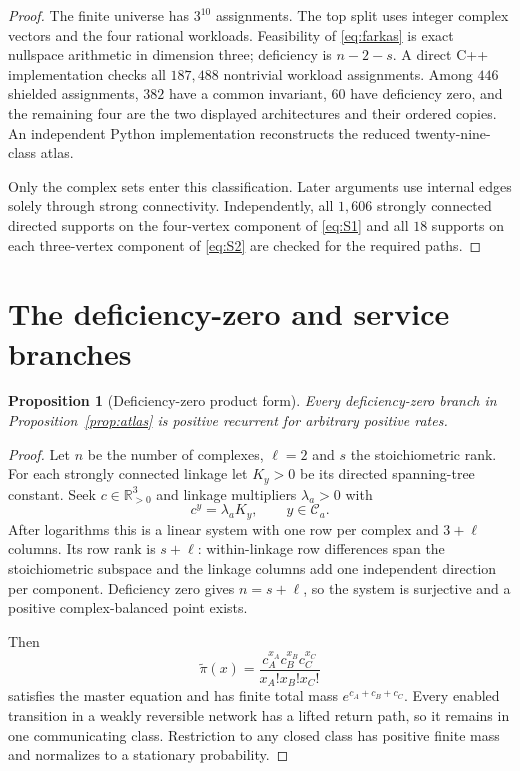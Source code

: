 \documentclass[11pt]{article}
\newtheorem{proposition}[theorem]{Proposition}
\theoremstyle{definition}\newtheorem{definition}[theorem]{Definition}
\theoremstyle{remark}\newtheorem{remark}[theorem]{Remark}
\begin{document}
\begin{proof}
The finite universe has $3^{10}$ assignments.  The top split uses integer complex vectors and the four rational workloads.  Feasibility of \eqref{eq:farkas} is exact nullspace arithmetic in dimension three; deficiency is $n-2-s$.  A direct C++ implementation checks all $187{,}488$ nontrivial workload assignments.  Among $446$ shielded assignments, $382$ have a common invariant, $60$ have deficiency zero, and the remaining four are the two displayed architectures and their ordered copies.  An independent Python implementation reconstructs the reduced twenty-nine-class atlas.

Only the complex sets enter this classification.  Later arguments use internal edges solely through strong connectivity.  Independently, all $1{,}606$ strongly connected directed supports on the four-vertex component of \eqref{eq:S1} and all $18$ supports on each three-vertex component of \eqref{eq:S2} are checked for the required paths.
\end{proof}

\section{The deficiency-zero and service branches}

\begin{proposition}[Deficiency-zero product form]\label{prop:dz}
Every deficiency-zero branch in Proposition~\ref{prop:atlas} is positive recurrent for arbitrary positive rates.
\end{proposition}

\begin{proof}
Let $n$ be the number of complexes, $\ell=2$ and $s$ the stoichiometric rank.  For each strongly connected linkage let $K_y>0$ be its directed spanning-tree constant.  Seek $c\in\mathbb R_{>0}^3$ and linkage multipliers $\lambda_a>0$ with
\[
 c^y=\lambda_aK_y,
 \qquad y\in\mathcal C_a.
\]
After logarithms this is a linear system with one row per complex and $3+\ell$ columns.  Its row rank is $s+\ell$: within-linkage row differences span the stoichiometric subspace and the linkage columns add one independent direction per component.  Deficiency zero gives $n=s+\ell$, so the system is surjective and a positive complex-balanced point exists.

Then
\[
 \widetilde\pi(x)=\frac{c_A^{x_A}c_B^{x_B}c_C^{x_C}}{x_A!x_B!x_C!}
\]
satisfies the master equation and has finite total mass $e^{c_A+c_B+c_C}$.  Every enabled transition in a weakly reversible network has a lifted return path, so it remains in one communicating class.  Restriction to any closed class has positive finite mass and normalizes to a stationary probability.
\end{proof}
\end{document}

